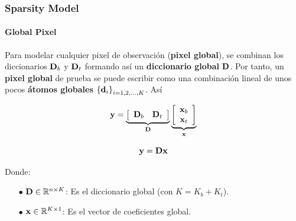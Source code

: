 \documentclass[spanish,xcolor=dvipsnames]{beamer}
\begin{document}
\begin{frame}
	\frametitle{Sparsity Model}
	\framesubtitle{Global Pixel}

Para modelar cualquier pixel de observación ({\bf pixel global}), se combinan los diccionarios ${\bf D}_b$ y ${\bf D}_t$ formando así un {\bf diccionario global} ${\bf D}$. Por tanto, un {\bf pixel global} de prueba se puede escribir como una combinación lineal de unos pocos {\bf átomos globales} ${\{{\bf d}_i\}}_{i=1,2,...,K}$. Así

	\begin {equation}
		\nonumber	{\bf y}=
		\underbrace{\left[
		\begin {array}{cc}
		{\bf D}_b & {\bf D}_t
		\end {array} 
		\right]}_{\bf D}
		\underbrace{\left[
		\begin {array}{c}
		{\bf x}_b \\ {\bf x}_t
		\end {array} 
		\right]}_{\bf x}
	\end{equation}	

	\begin {equation}
		\nonumber {\bf y}={\bf D}{\bf x}
	\end {equation}

Donde:
	\begin{itemize}	
		\item[\color {black}\bf $\bullet$] ${\bf D} \in \mathbb{R}^{n \times {K}}$: Es el diccionario global (con $K=K_b+K_t$).\\
		\item[\color {black}\bf $\bullet$] ${{\bf x}} \in \mathbb{R}^{K \times 1}$: Es el vector de coeficientes global.\\
	\end{itemize}

\end{frame}
\end{document}
